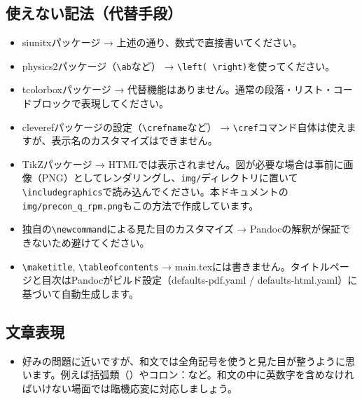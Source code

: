 \subsection{使えない記法（代替手段）}
\begin{itemize}
    \item siunitxパッケージ → 上述の通り、数式で直接書いてください。
    \item physics2パッケージ（\texttt{\textbackslash ab}など） → \texttt{\textbackslash left( \textbackslash right)}を使ってください。
    \item tcolorboxパッケージ → 代替機能はありません。通常の段落・リスト・コードブロックで表現してください。
    \item cleverefパッケージの設定（\texttt{\textbackslash crefname}など） → \texttt{\textbackslash cref}コマンド自体は使えますが、表示名のカスタマイズはできません。
    \item TikZパッケージ → HTMLでは表示されません。図が必要な場合は事前に画像（PNG）としてレンダリングし、\texttt{img/}ディレクトリに置いて\texttt{\textbackslash includegraphics}で読み込んでください。本ドキュメントの\texttt{img/precon\_q\_rpm.png}もこの方法で作成しています。
    \item 独自の\texttt{\textbackslash newcommand}による見た目のカスタマイズ → Pandocの解釈が保証できないため避けてください。
    \item \texttt{\textbackslash maketitle}, \texttt{\textbackslash tableofcontents} → main.texには書きません。タイトルページと目次はPandocがビルド設定（defaults-pdf.yaml / defaults-html.yaml）に基づいて自動生成します。
\end{itemize}

\subsection{文章表現}
\begin{itemize}
    \item 好みの問題に近いですが、和文では全角記号を使うと見た目が整うように思います。例えば括弧類（）やコロン：など。和文の中に英数字を含めなければいけない場面では臨機応変に対応しましょう。
\end{itemize}
